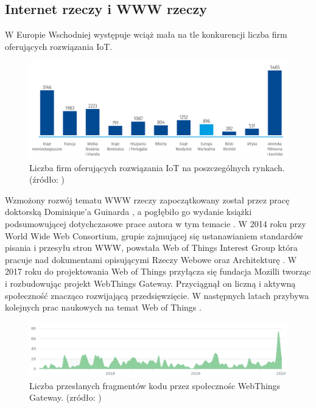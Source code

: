 \documentclass[11pt]{report}
\begin{document}
 \subsection{Internet rzeczy i WWW rzeczy}
 W Europie Wschodniej występuje wciąż mała na tle konkurencji liczba firm oferujących rozwiązania IoT.
  \begin{figure}[ht]
\centering
\includegraphics[width=0.8 \textwidth]{fig/liczba_firm_rozwiazania_iot.png}
\caption{Liczba firm oferujących rozwiązania IoT na poszczególnych rynkach. (źródło: \cite{gov2019})}
\label{fig:firmy}
\end{figure}
 Wzmożony rozwój tematu WWW rzeczy zapoczątkowany został przez pracę doktorską Dominique'a Guinarda \cite{Guinard2011}, a pogłębiło go wydanie książki \cite{Guinard2017} podsumowującej dotychczasowe prace autora w tym temacie \cite{Guinard2009} \cite{Guinard2010} \cite{Guinard2010a} \cite{Guinard2011} \cite{Guinard2011a}.
 W 2014 roku przy World Wide Web Consortium, grupie zajmującej się ustanawianiem standardów pisania i przesyłu stron WWW, powstała Web of Things Interest Group \cite{wotig2014} która pracuje nad dokumentami opisującymi Rzeczy Webowe \cite{thingdescription} oraz Architekturę \cite{wotarchitecture}.
 W 2017 roku do projektowania Web of Things przyłącza się fundacja Mozilli \cite{mozilla2017} tworząc i rozbudowując projekt WebThings Gateway. Przyciągnął on liczną i aktywną społeczność znacząco rozwijającą przedsięwzięcie.  W następnych latach przybywa kolejnych prac naukowych na temat Web of Things \cite{IEEE2018} \cite{Raggett2018} \cite{Korkan2019}.
   \begin{figure}[ht]
\centering
\includegraphics[width=0.8 \textwidth]{fig/contributions.png}
\caption{Liczba przesłanych fragmentów kodu przez społecznośc WebThings Gateway. (zródło: \cite{gatewaycommits2020})}
\label{fig:firmy}
\end{figure}
\end{document}
